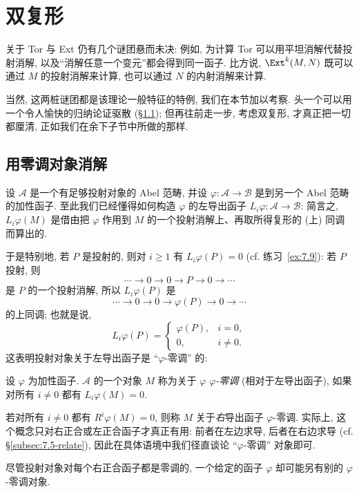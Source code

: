 \section{双复形}
\label{sec:double-complexes}

关于 Tor 与 Ext 仍有几个谜团悬而未决: 例如, 为计算 Tor 可以用平坦消解代替投射消解, 以及``消解任意一个变元''都会得到同一函子. 比方说, $\Ext^k(M,N)$ 既可以通过 $M$ 的投射消解来计算, 也可以通过 $N$ 的内射消解来计算.

当然, 这两桩谜团都是该理论一般特征的特例, 我们在本节加以考察. 头一个可以用一个令人愉快的归纳论证驱散 (\S\ref{subsec:8.1-acyclic}); 但再往前走一步, 考虑双复形, 才真正把一切都厘清, 正如我们在余下子节中所做的那样.

\subsection{用零调对象消解}
\label{subsec:8.1-acyclic}

设 $\mathcal{A}$ 是一个有足够投射对象的 Abel 范畴, 并设 $\varphi:\mathcal{A}\to\mathcal{B}$ 是到另一个 Abel 范畴的加性函子. 至此我们已经懂得如何构造 $\varphi$ 的左导出函子 $L_i\varphi:\mathcal{A}\to\mathcal{B}$: 简言之, $L_i\varphi(M)$ 是借由把 $\varphi$ 作用到 $M$ 的一个投射消解上、再取所得复形的 (上) 同调而算出的.

于是特别地, 若 $P$ 是投射的, 则对 $i\ge 1$ 有 $L_i\varphi(P)=0$ (cf. 练习~\ref{ex:7.9}): 若 $P$ 投射, 则
\[
\cdots \longrightarrow 0 \longrightarrow 0 \longrightarrow P \longrightarrow 0 \longrightarrow \cdots
\]
是 $P$ 的一个投射消解, 所以 $L_i\varphi(P)$ 是
\[
\cdots \longrightarrow 0 \longrightarrow 0 \longrightarrow \varphi(P) \longrightarrow 0 \longrightarrow \cdots
\]
的上同调; 也就是说,
\[
L_i\varphi(P)=
\begin{cases}
\varphi(P), & i=0,\\
0, & i\neq 0.
\end{cases}
\]
这表明投射对象关于左导出函子是 ``$\varphi$-零调'' 的:

\begin{definition}\label{def:8.1-acyclic}
设 $\varphi$ 为加性函子. $\mathcal{A}$ 的一个对象 $M$ 称为关于 $\varphi$ \emph{$\varphi$-零调} (相对于左导出函子), 如果对所有 $i\neq 0$ 都有 $L_i\varphi(M)=0$.

若对所有 $i\neq 0$ 都有 $R^i\varphi(M)=0$, 则称 $M$ 关于\emph{右}导出函子 $\varphi$-零调. 实际上, 这个概念只对右正合或左正合函子才真正有用: 前者在左边求导, 后者在右边求导 (cf. \S\ref{subsec:7.5-relate}), 因此在具体语境中我们径直谈论 ``$\varphi$-零调'' 对象即可.

尽管投射对象对每个右正合函子都是零调的, 一个给定的函子 $\varphi$ 却可能另有别的 $\varphi$-零调对象.
\end{definition}

